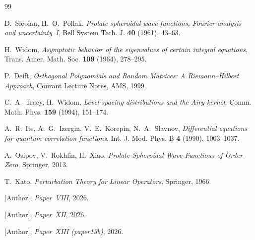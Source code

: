 \documentclass[12pt,a4paper]{amsart}
\theoremstyle{definition}
\theoremstyle{remark}
\begin{document}
\begin{thebibliography}{99}

D.~Slepian, H.~O.~Pollak,
\textit{Prolate spheroidal wave functions, Fourier analysis and
uncertainty~I},
Bell System Tech. J. \textbf{40} (1961), 43--63.

H.~Widom,
\textit{Asymptotic behavior of the eigenvalues of certain integral
equations},
Trans. Amer. Math. Soc. \textbf{109} (1964), 278--295.

P.~Deift,
\textit{Orthogonal Polynomials and Random Matrices: A Riemann--Hilbert
Approach},
Courant Lecture Notes, AMS, 1999.

C.~A.~Tracy, H.~Widom,
\textit{Level-spacing distributions and the Airy kernel},
Comm. Math. Phys. \textbf{159} (1994), 151--174.

A.~R.~Its, A.~G.~Izergin, V.~E.~Korepin, N.~A.~Slavnov,
\textit{Differential equations for quantum correlation functions},
Int. J. Mod. Phys. B \textbf{4} (1990), 1003--1037.

A.~Osipov, V.~Rokhlin, H.~Xiao,
\textit{Prolate Spheroidal Wave Functions of Order Zero},
Springer, 2013.

T.~Kato,
\textit{Perturbation Theory for Linear Operators},
Springer, 1966.

[Author], \textit{Paper~VIII}, 2026.

[Author], \textit{Paper~XII}, 2026.

[Author], \textit{Paper~XIII (paper13b)}, 2026.

\end{thebibliography}
\end{document}
